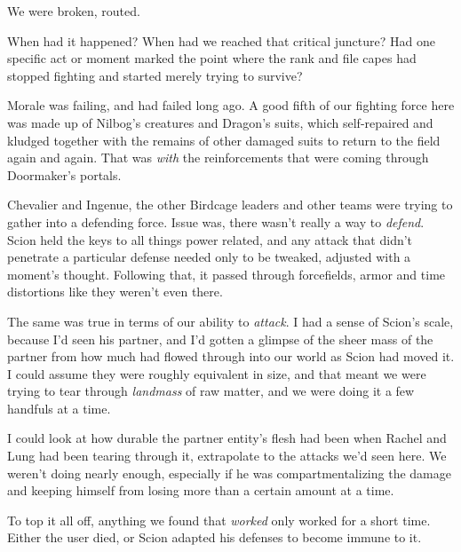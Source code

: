 





We were broken, routed.



When had it happened?  When had we reached that critical juncture?  Had one specific act or moment marked the point where the rank and file capes had stopped fighting and started merely trying to survive?



Morale was failing, and had failed long ago.  A good fifth of our fighting force here was made up of Nilbog's creatures and Dragon's suits, which self-repaired and kludged together with the remains of other damaged suits to return to the field again and again.  That was \emph{with} the reinforcements that were coming through Doormaker's portals.



Chevalier and Ingenue, the other Birdcage leaders and other teams were trying to gather into a defending force.  Issue was, there wasn't really a way to \emph{defend}.  Scion held the keys to all things power related, and any attack that didn't penetrate a particular defense needed only to be tweaked, adjusted with a moment's thought.  Following that, it passed through forcefields, armor and time distortions like they weren't even there.



The same was true in terms of our ability to \emph{attack}.  I had a sense of Scion's scale, because I'd seen his partner, and I'd gotten a glimpse of the sheer mass of the partner from how much had flowed through into our world as Scion had moved it.  I could assume they were roughly equivalent in size, and that meant we were trying to tear through \emph{landmass} of raw matter, and we were doing it a few handfuls at a time.



I could look at how durable the partner entity's flesh had been when Rachel and Lung had been tearing through it, extrapolate to the attacks we'd seen here.  We weren't doing nearly enough, especially if he was compartmentalizing the damage and keeping himself from losing more than a certain amount at a time.



To top it all off, anything we found that \emph{worked} only worked for a short time.  Either the user died, or Scion adapted his defenses to become immune to it.



